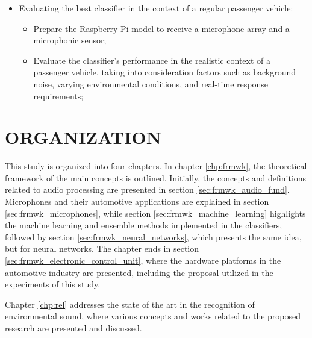 \begin{itemize}
\begin{itemize}
    \end{itemize}
    \item Evaluating the best classifier in the context of a regular passenger vehicle:
    \begin{itemize}
        \item Prepare the Raspberry Pi model to receive a microphone array and a microphonic sensor;
        \item Evaluate the classifier's performance in the realistic context of a passenger vehicle, taking into consideration factors such as background noise, varying environmental conditions, and real-time response requirements;
    \end{itemize}
\end{itemize}


\section{ORGANIZATION}
\label{sec:introduction_organization}

This study is organized into four chapters. In chapter \ref{chp:frmwk}, the theoretical framework of the main concepts is outlined. Initially, the concepts and definitions related to audio processing are presented in section \ref{sec:frmwk_audio_fund}. Microphones and their automotive applications are explained in section \ref{sec:frmwk_microphones}, while section \ref{sec:frmwk_machine_learning} highlights the machine learning and ensemble methods implemented in the classifiers, followed by section \ref{sec:frmwk_neural_networks}, which presents the same idea, but for neural networks. The chapter ends in section \ref{sec:frmwk_electronic_control_unit}, where the hardware platforms in the automotive industry are presented, including the proposal utilized in the experiments of this study.

Chapter \ref{chp:rel} addresses the state of the art in the recognition of environmental sound, where various concepts and works related to the proposed research are presented and discussed.

